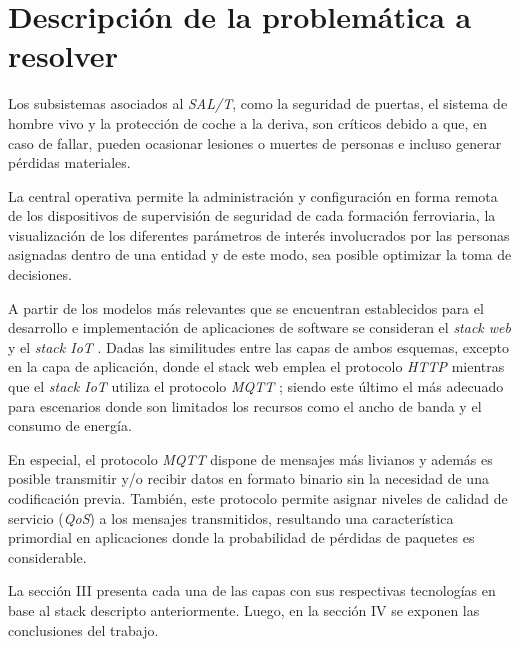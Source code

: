 \section{Descripción de la problemática a resolver}

Los subsistemas asociados al \textit{SAL/T}, como la seguridad de puertas, el sistema de hombre vivo y la protección de coche a la deriva, son críticos debido a que, en caso de fallar, pueden ocasionar lesiones o muertes de personas e incluso generar pérdidas materiales. 

La central operativa permite la administración y configuración en forma remota de los dispositivos de supervisión de seguridad de cada formación ferroviaria, la visualización de los diferentes parámetros de interés involucrados por las personas asignadas dentro de una entidad y de este modo, sea posible optimizar la toma de decisiones. 

A partir de los modelos más relevantes que se encuentran establecidos para el desarrollo e implementación de aplicaciones de software se consideran el \textit{stack web} y el \textit{stack IoT} \cite{b4}. 
Dadas las similitudes entre las capas de ambos esquemas, excepto en la capa de aplicación, donde el stack web emplea el protocolo \textit{HTTP} \cite{b5} mientras que el \textit{stack IoT} utiliza el protocolo \textit{MQTT} \cite{b6}; siendo este último el más adecuado para escenarios donde son limitados los recursos como el ancho de banda y el consumo de energía.

En especial, el protocolo \textit{MQTT} dispone de mensajes más livianos y además es posible transmitir y/o recibir datos en formato binario sin la necesidad de una codificación previa. También, este protocolo permite asignar niveles de calidad de servicio (\textit{QoS}) \cite{b7} a los mensajes transmitidos, resultando una característica primordial en aplicaciones donde la probabilidad de pérdidas de paquetes es considerable.

La sección III presenta cada una de las capas con sus respectivas tecnologías en base al stack descripto anteriormente. Luego, en la sección IV se exponen las conclusiones del trabajo.


